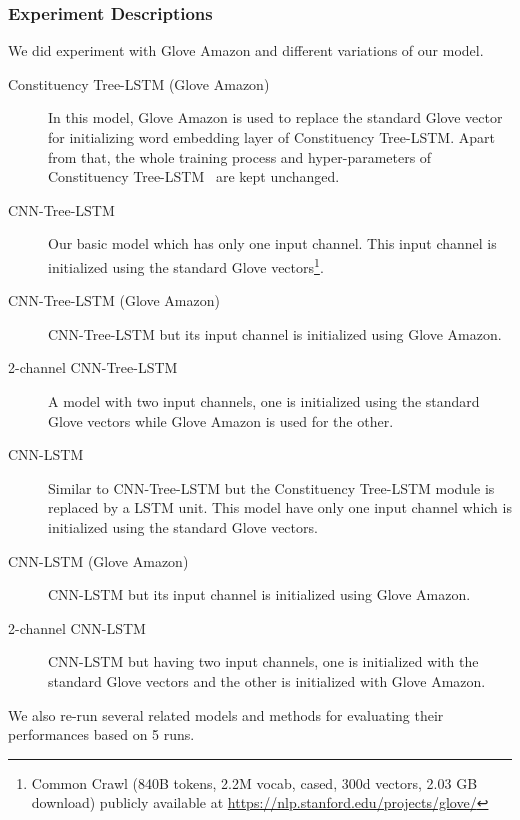 \subsubsection{Experiment Descriptions}
We did experiment with Glove Amazon and different variations of our model.
\begin{description}
	\item[Constituency Tree-LSTM (Glove Amazon)] In this model, Glove Amazon is used to replace the standard Glove vector for initializing word embedding layer of Constituency Tree-LSTM.
	Apart from that, the whole training process and hyper-parameters of Constituency Tree-LSTM~\cite{treelstm} are kept unchanged.
	\item[CNN-Tree-LSTM] Our basic model which has only one input channel. 
	This input channel is initialized using the standard Glove vectors\footnote{Common Crawl (840B tokens, 2.2M vocab, cased, 300d vectors, 2.03 GB download) publicly available at \url{https://nlp.stanford.edu/projects/glove/}}.
	\item[CNN-Tree-LSTM (Glove Amazon)] CNN-Tree-LSTM but its input channel is initialized using Glove Amazon.
	\item [2-channel CNN-Tree-LSTM] A model with two input channels, one is initialized using the standard Glove vectors while Glove Amazon is used for the other.
	\item[CNN-LSTM] Similar to CNN-Tree-LSTM but the Constituency Tree-LSTM module is replaced by a LSTM unit.
	This model have only one input channel which is initialized using the standard Glove vectors.
	\item [CNN-LSTM (Glove Amazon)] CNN-LSTM but its input channel is initialized using Glove Amazon.
	\item [2-channel CNN-LSTM] CNN-LSTM but having two input channels, one is initialized with the standard Glove vectors and the other is initialized with Glove Amazon.
\end{description}
We also re-run several related models and methods for evaluating their performances based on 5 runs.
